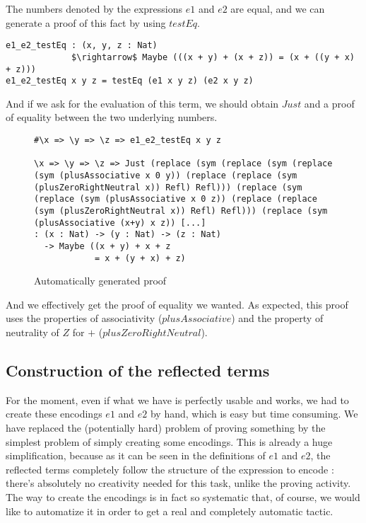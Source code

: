 The numbers denoted by the expressions $e1$ and $e2$ are equal, and we can generate a proof of this fact by using $testEq$.


\begin{lstlisting}
e1_e2_testEq : (x, y, z : Nat) 
             $\rightarrow$ Maybe (((x + y) + (x + z)) = (x + ((y + x) + z)))
e1_e2_testEq x y z = testEq (e1 x y z) (e2 x y z)
\end{lstlisting}



And if we ask for the evaluation of this term, we should obtain $Just$ and a proof of equality between the two underlying numbers.

\begin{figure}[H]
\figrule
\begin{center}
\begin{lstlisting}
#\x => \y => \z => e1_e2_testEq x y z

\x => \y => \z => Just (replace (sym (replace (sym (replace 
(sym (plusAssociative x 0 y)) (replace (replace (sym 
(plusZeroRightNeutral x)) Refl) Refl))) (replace (sym 
(replace (sym (plusAssociative x 0 z)) (replace (replace 
(sym (plusZeroRightNeutral x)) Refl) Refl))) (replace (sym 
(plusAssociative (x+y) x z)) [...]
: (x : Nat) -> (y : Nat) -> (z : Nat) 
  -> Maybe ((x + y) + x + z 
            = x + (y + x) + z)
\end{lstlisting}
\end{center}
\caption{Automatically generated proof}
\label{obtainedProof}
\figrule
\end{figure}

And we effectively get the proof of equality we wanted. As expected, this proof uses the properties of associativity ($plusAssociative$) and the property of neutrality of $Z$ for $+$ ($plusZeroRightNeutral$).


\subsection{Construction of the reflected terms}
\label{sect:ReflectNat}

For the moment, even if what we have is perfectly usable and works, we had to create these encodings $e1$ and $e2$ by hand, which is easy but time consuming. We have replaced the (potentially hard) problem of proving something by the simplest problem of simply creating some encodings. This is already a huge simplification, because as it can be seen in the definitions of $e1$ and $e2$, the reflected terms completely follow the structure of the expression to encode : there's absolutely no creativity needed for this task, unlike the proving activity. The way to create the encodings is in fact so systematic that, of course, we would like to automatize it in order to get a real and completely automatic tactic.

